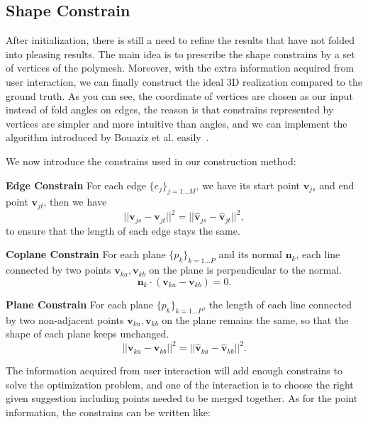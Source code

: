 \subsection{Shape Constrain}
After initialization, there is still a need to refine the results that have not folded into pleasing results. The main idea is to prescribe the shape constrains by a set of vertices of the polymesh. Moreover, with the extra information acquired from user interaction, we can finally construct the ideal 3D realization compared to the ground truth. As you can see, the coordinate of vertices are chosen as our input instead of fold angles on edges, the reason is that constrains represented by vertices are simpler and more intuitive than angles, and we can implement the algorithm introduced by Bouaziz et al. easily~\cite{Bouaziz:2012:SSD:2346796.2346802}.

We now introduce the constrains used in our construction method:

\noindent
\textbf{Edge Constrain} For each edge $\{e_j\}_{j=1...M}$, we have its start point $\mathbf{v}_{js}$ and end point $\mathbf{v}_{jt}$, then we have 
\begin{equation}
||\mathbf{v}_{js} - \mathbf{v}_{jt}||^2 = ||\mathbf{\hat{v}}_{js} - \mathbf{\hat{v}}_{jt}||^2,
\label{equ:edge}
\end{equation}
to ensure that the length of each edge stays the same.

\noindent
\textbf{Coplane Constrain} For each plane $\{p_k\}_{k=1 \dots P}$ and its normal $\mathbf{n}_k$, each line connected by two points $\mathbf{v}_{ka}, \mathbf{v}_{kb}$ on the plane is perpendicular to the normal.
\begin{equation}
\mathbf{n}_k \cdot (\mathbf{v}_{ka} - \mathbf{v}_{kb}) = 0.
\label{equ:coplane}
\end{equation}

\noindent
\textbf{Plane Constrain} For each plane $\{p_k\}_{k=1 \dots P}$, the length of each line connected by two non-adjacent points $\mathbf{v}_{ka}, \mathbf{v}_{kb}$ on the plane remains the same, so that the shape of each plane keeps unchanged.
\begin{equation}
||\mathbf{v}_{ka} - \mathbf{v}_{kb}||^2 = ||\hat{\mathbf{v}}_{ka} - \hat{\mathbf{v}}_{kb}||^2.
\label{equ:plane}
\end{equation}

The information acquired from user interaction will add enough constrains to solve the optimization problem, and one of the interaction is to choose the right given suggestion including points needed to be merged together. As for the point information, the constrains can be written like:

